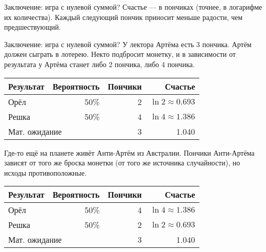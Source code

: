 \documentclass{beamer}
\begin{document}
\begin{frame}{Заключение: игра с нулевой суммой?}
\justify
Счастье --- в пончиках (точнее, в логарифме их количества). Каждый следующий пончик приносит меньше радости, чем предшествующий.

\justify
\centering
{}
\end{frame}



\begin{frame}{Заключение: игра с нулевой суммой?}
\justify
У лектора Артёма есть 3 пончика. Артём должен сыграть в лотерею. Некто подбросит монетку, и в зависимости от результата у Артёма станет либо 2 пончика, либо 4 пончика.

\justify
\centering
\begin{tabular}{l|r|r|r}
Результат & Вероятность & Пончики & Счастье \\ \hline
Орёл & 50\% & 2 & $\ln 2 \approx 0.693$ \\
Решка & 50\% & 4 & $\ln 4 \approx 1.386$ \\ \hline
\multicolumn{2}{l|}{Мат. ожидание} & 3 & 1.040
\end{tabular}

\justify
Где-то ещё на планете живёт Анти-Артём из Австралии. Пончики Анти-Артёма зависят от того же броска монетки (от того же источника случайности), но исходы противоположные.

\justify
\centering
\begin{tabular}{l|r|r|r}
Результат & Вероятность & Пончики & Счастье \\ \hline
Орёл & 50\% & 4 & $\ln 4 \approx 1.386$ \\ 
Решка & 50\% & 2 & $\ln 2 \approx 0.693$ \\ \hline
\multicolumn{2}{l|}{Мат. ожидание} & 3 & 1.040
\end{tabular}
\end{frame}
\end{document}
